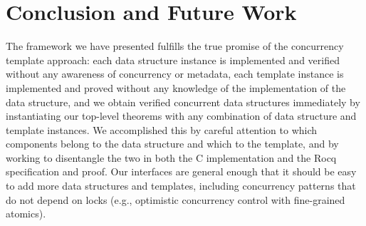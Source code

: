 \documentclass[sigplan,screen]{acmart}
\newcommand{\ignore}[1]{}
\begin{document}
\section{Conclusion and Future Work}
The framework we have presented fulfills the true promise of the concurrency template approach: each data structure instance is implemented and verified without any awareness of concurrency or metadata, each template instance is implemented and proved without any knowledge of the implementation of the data structure, and we obtain verified concurrent data structures immediately by instantiating our top-level theorems with any combination of data structure and template instances. We accomplished this by careful attention to which components belong to the data structure and which to the template, and by working to disentangle the two in both the C implementation and the Rocq specification and proof. Our interfaces are general enough that it should be easy to add more data structures and templates, including concurrency patterns that do not depend on locks (e.g., optimistic concurrency control with fine-grained atomics). %

\ignore{
\begin{acks}
We thank Nisarg Patel for detailed discussions about the original search structure template proofs.
This work was partially funded by the National Science Foundation under the award ???.
\end{acks}
}

\clearpage



\end{document}

